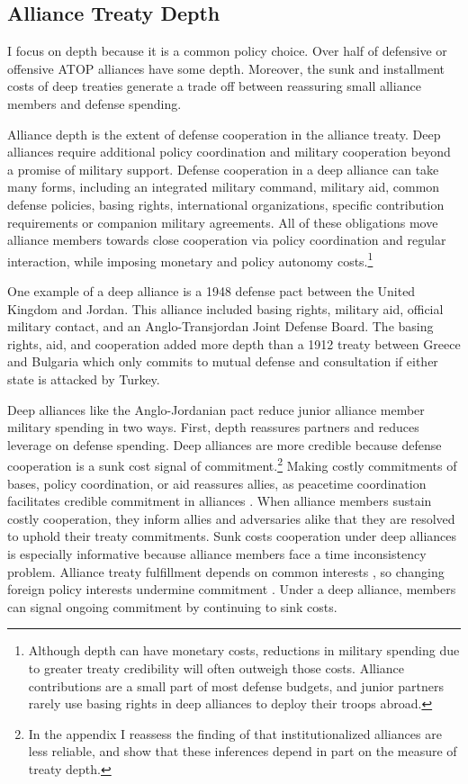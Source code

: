 \documentclass[12pt]{article}
\begin{document}
\subsection{Alliance Treaty Depth} 


I focus on depth because it is a common policy choice.
Over half of defensive or offensive ATOP alliances have some depth. 
Moreover, the sunk and installment costs of deep treaties generate a trade off between reassuring small alliance members and defense spending.


Alliance depth is the extent of defense cooperation in the alliance treaty. 
Deep alliances require additional policy coordination and military cooperation beyond a promise of military support.  
Defense cooperation in a deep alliance can take many forms, including an integrated military command, military aid, common defense policies, basing rights, international organizations, specific contribution requirements or companion military agreements. 
All of these obligations move alliance members towards close cooperation via policy coordination and regular interaction, while imposing monetary and policy autonomy costs.\footnote{Although depth can have monetary costs, reductions in military spending due to greater treaty credibility will often outweigh those costs. Alliance contributions are a small part of most defense budgets, and junior partners rarely use basing rights in deep alliances to deploy their troops abroad.} 

 
One example of a deep alliance is a 1948 defense pact between the United Kingdom and Jordan.
This alliance included basing rights, military aid, official military contact, and an Anglo-Transjordan Joint Defense Board.  
The basing rights, aid, and cooperation added more depth than a 1912 treaty between Greece and Bulgaria which only commits to mutual defense and consultation if either state is attacked by Turkey. 


Deep alliances like the Anglo-Jordanian pact reduce junior alliance member military spending in two ways. 
First, depth reassures partners and reduces leverage on defense spending.  
Deep alliances are more credible because defense cooperation is a sunk cost signal of commitment.\footnote{In the appendix I reassess the finding of \citet{LeedsAnac2005} that institutionalized alliances are less reliable, and show that these inferences depend in part on the measure of treaty depth.}
Making costly commitments of bases, policy coordination, or aid reassures allies, as peacetime coordination facilitates credible commitment in alliances \citep{Morrow1994}. 
When alliance members sustain costly cooperation, they inform allies and adversaries alike that they are resolved to uphold their treaty commitments. 
Sunk costs cooperation under deep alliances is especially informative because alliance members face a time inconsistency problem. 
Alliance treaty fulfillment depends on common interests \citep{Morrow2000, Leeds2003a}, so changing foreign policy interests undermine commitment \citep{LeedsSavun2007}. 
Under a deep alliance, members can signal ongoing commitment by continuing to sink costs.  
\end{document}
